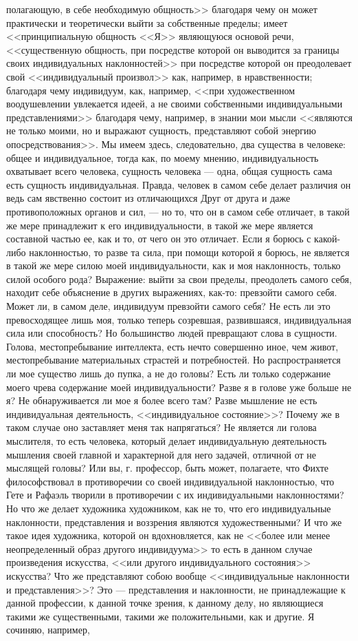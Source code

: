 \documentclass[12pt]{article}
\begin{document}
полагающую, в себе необходимую общность>>  благодаря чему он может практически и теоретически выйти за собственные пределы; имеет <<принципиальную общность <<Я>>  являющуюся основой речи, <<существенную общность, при посредстве которой он выводится за границы своих индивидуальных наклонностей>>  при посредстве которой он преодолевает свой <<индивидуальный произвол>>  как, например, в нравственности; благодаря чему индивидуум, как, например, <<при художественном воодушевлении увлекается идеей, а не своими собственными индивидуальными представлениями>>  благодаря чему, например, в знании мои мысли <<являются не только моими, но и выражают сущность, представляют собой энергию опосредствования>>. Мы имеем здесь, следовательно, два существа в человеке: общее и индивидуальное, тогда как, по моему мнению, индивидуальность охватывает всего человека, сущность человека --- одна, общая сущность сама есть сущность индивидуальная. Правда, человек в самом себе делает различия он ведь сам явственно состоит из отличающихся Друг от друга и даже противоположных органов и сил, --- но то, что он в самом себе отличает, в такой же мере принадлежит к его индивидуальности, в такой же мере является составной частью ее, как и то, от чего он это отличает. Если я борюсь с какой-либо наклонностью, то разве та сила, при помощи которой я борюсь, не является в такой же мере силою моей индивидуальности, как и моя наклонность, только силой особого рода? Выражение: выйти за свои пределы, преодолеть самого себя, находит себе объяснение в других выражениях, как-то: превзойти самого себя. Может ли, в самом деле, индивидуум превзойти самого себя? Не есть ли это превосходящее лишь моя, только теперь созревшая, развившаяся, индивидуальная сила или способность? Но большинство людей превращают слова в сущности. Голова, местопребывание интеллекта, есть нечто совершенно иное, чем живот, местопребывание материальных страстей и потребностей. Но распространяется ли мое существо лишь до пупка, а не до головы? Есть ли только содержание моего чрева содержание моей индивидуальности? Разве я в голове уже больше не я? Не обнаруживается ли мое я более всего там? Разве мышление не есть индивидуальная деятельность, <<индивидуальное состояние>>? Почему же в таком случае оно заставляет меня так напрягаться? Не является ли голова мыслителя, то есть человека, который делает индивидуальную деятельность мышления своей главной и характерной для него задачей, отличной от не мыслящей головы? Или вы, г. профессор, быть может, полагаете, что Фихте философствовал в противоречии со своей индивидуальной наклонностью, что Гете и Рафаэль творили в противоречии с их индивидуальными наклонностями? Но что же делает художника художником, как не то, что его индивидуальные наклонности, представления и воззрения являются художественными? И что же такое идея художника, которой он вдохновляется, как не <<более или менее неопределенный образ другого индивидуума>>  то есть в данном случае произведения искусства, <<или другого индивидуального состояния>> искусства? Что же представляют собою вообще <<индивидуальные наклонности и представления>>? Это --- представления и наклонности, не принадлежащие к данной профессии, к данной точке зрения, к данному делу, но являющиеся такими же существенными, такими же положительными, как и другие. Я сочиняю, например, 
\end{document}
